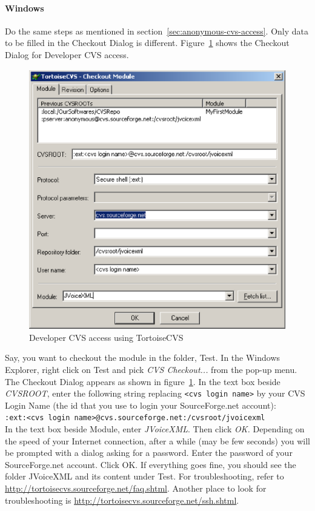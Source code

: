 \documentclass[11pt,a4paper]{article}
\begin{document}
\paragraph{Windows}

Do the same steps as mentioned in section~\ref{sec:anonymous-cvs-access}. 
Only data to be filled in the Checkout Dialog is different.
Figure~\ref{fig:tortoise-developer} shows the Checkout Dialog for Developer 
CVS access.

\begin{figure}
\label{fig:tortoise-developer}
\caption{Developer CVS access using TortoiseCVS}
\begin{center}
\includegraphics[scale=0.5]{tortoise-developer.eps}
\end{center}
\end{figure}

Say, you want to checkout the module in the folder, Test. In the Windows 
Explorer, right click on Test and pick \emph{CVS Checkout...} from the 
pop-up menu. 
The Checkout Dialog appears as shown in figure~\ref{fig:tortoise-developer}. 
In the text box beside \emph{CVSROOT}, enter the following string replacing  
\texttt{<cvs login name>} by your CVS Login Name (the id that you use to 
login your SourceForge.net account):\\
\texttt{:ext:<cvs login name>@cvs.sourceforge.net:/cvsroot/jvoicexml} \\
In the text box beside Module, enter \emph{JVoiceXML}. Then click \emph{OK.}
Depending on the speed of your Internet connection, after a while (may be few 
seconds) you will be prompted with a dialog asking for a password. Enter the
password of your SourceForge.net account. Click OK. If everything goes fine, 
you should see the folder JVoiceXML and its content under Test. 
For troubleshooting, refer to 
\url{http://tortoisecvs.sourceforge.net/faq.shtml}. 
Another place to look for  troubleshooting is 
\url{http://tortoisecvs.sourceforge.net/ssh.shtml}.
\end{document}

